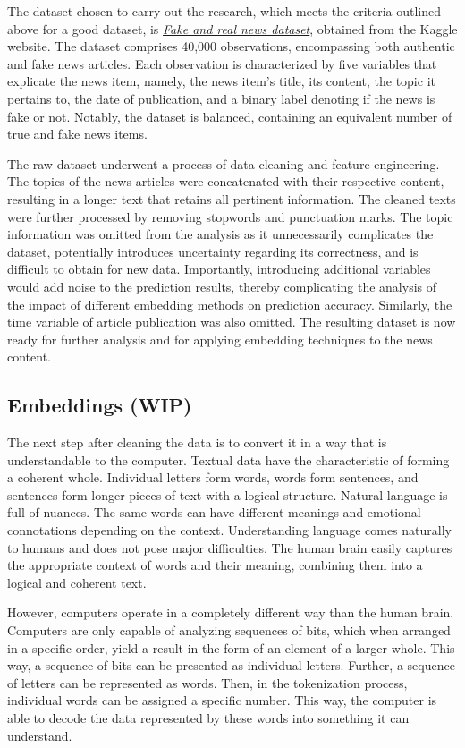 The dataset chosen to carry out the research, which meets the criteria outlined above for a good dataset, is \href{https://www.kaggle.com/datasets/clmentbisaillon/fake-and-real-news-dataset}{\textit{Fake and real news dataset}}, obtained from the Kaggle website. The dataset comprises 40,000 observations, encompassing both authentic and fake news articles. Each observation is characterized by five variables that explicate the news item, namely, the news item's title, its content, the topic it pertains to, the date of publication, and a binary label denoting if the news is fake or not. Notably, the dataset is balanced, containing an equivalent number of true and fake news items.

The raw dataset underwent a process of data cleaning and feature engineering. The topics of the news articles were concatenated with their respective content, resulting in a longer text that retains all pertinent information. The cleaned texts were further processed by removing stopwords and punctuation marks. The topic information was omitted from the analysis as it unnecessarily complicates the dataset, potentially introduces uncertainty regarding its correctness, and is difficult to obtain for new data. Importantly, introducing additional variables would add noise to the prediction results, thereby complicating the analysis of the impact of different embedding methods on prediction accuracy. Similarly, the time variable of article publication was also omitted. The resulting dataset is now ready for further analysis and for applying embedding techniques to the news content.

\subsection{Embeddings (WIP)}
The next step after cleaning the data is to convert it in a way that is understandable to the computer. Textual data have the characteristic of forming a coherent whole. Individual letters form words, words form sentences, and sentences form longer pieces of text with a logical structure. Natural language is full of nuances. The same words can have different meanings and emotional connotations depending on the context. Understanding language comes naturally to humans and does not pose major difficulties. The human brain easily captures the appropriate context of words and their meaning, combining them into a logical and coherent text.

However, computers operate in a completely different way than the human brain. Computers are only capable of analyzing sequences of bits, which when arranged in a specific order, yield a result in the form of an element of a larger whole. This way, a sequence of bits can be presented as individual letters. Further, a sequence of letters can be represented as words. Then, in the tokenization process, individual words can be assigned a specific number. This way, the computer is able to decode the data represented by these words into something it can understand.

